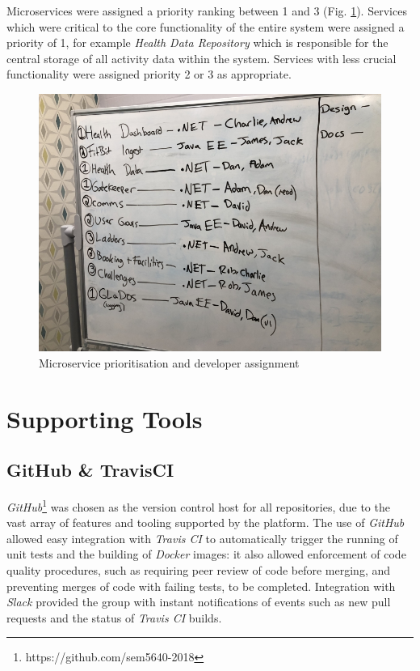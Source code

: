 Microservices were assigned a priority ranking between 1 and 3 (Fig. \ref{fig:numbering_microservice_priority}). Services which were critical to the core functionality of the entire system were assigned a priority of 1, for example \textit{Health Data Repository} which is responsible for the central storage of all activity data within the system. Services with less crucial functionality were assigned priority 2 or 3 as appropriate.

\begin{figure}[H]
    \centering
    \includegraphics[width=\textwidth]{Images/Numbering_Microservices.jpg}
    \caption{Microservice prioritisation and developer assignment}
    \label{fig:numbering_microservice_priority}
\end{figure}


\section{Supporting Tools}
\subsection{GitHub \& TravisCI}
\textit{GitHub}\footnote{https://github.com/sem5640-2018} was chosen as the version control host for all repositories, due to the vast array of features and tooling supported by the platform. The use of \textit{GitHub} allowed easy integration with \textit{Travis CI} to automatically trigger the running of unit tests and the building of \textit{Docker} images: it also allowed enforcement of code quality procedures, such as requiring peer review of code before merging, and preventing merges of code with failing tests, to be completed. Integration with \textit{Slack} provided the group with instant notifications of events such as new pull requests and the status of \textit{Travis CI} builds.

